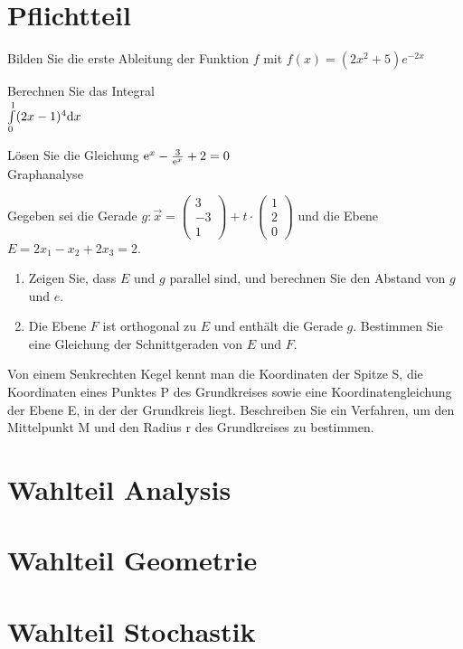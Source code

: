 



\section{Pflichtteil}
 Bilden Sie die erste Ableitung der Funktion $f$ mit $f(x) = (2x^2+5)e^{-2x}$

 Berechnen Sie das Integral\\
$\int\limits_0^1(2x-1)^4 \mathrm{d} x$

Lösen Sie die Gleichung $\mathrm{e}^x-\frac{3}{\mathrm{e}^x}+2=0$\\

\aufgabe{}
Graphanalyse
\loesung{}

Gegeben sei die Gerade $g: \vec x=\left(\begin{array}{c} 3 \\ -3 \\ 1 \end{array}\right) + t\cdot \left( \begin{array}{c} 1 \\ 2 \\ 0 \end{array} \right)$ und die Ebene $E = 2x_1-x_2+2x_3=2$.
\begin{enumerate}
  \item Zeigen Sie, dass $E$ und $g$ parallel sind, und berechnen Sie den Abstand von $g$ und $e$.
  \item Die Ebene $F$ ist orthogonal zu $E$ und enthält die Gerade $g$. Bestimmen Sie eine Gleichung der Schnittgeraden von $E$ und $F$.
\end{enumerate}

Von einem Senkrechten Kegel kennt man die Koordinaten der Spitze S, die Koordinaten eines Punktes P des Grundkreises sowie eine Koordinatengleichung der Ebene E, in der der Grundkreis liegt. Beschreiben Sie ein Verfahren, um den Mittelpunkt M und den Radius r des Grundkreises zu bestimmen.


\loesung{}


\section{Wahlteil Analysis}

\aufgabe{}

\aufgabe{}

\aufgabe{}

\section{Wahlteil Geometrie}

\aufgabe{}

\aufgabe{}

\aufgabe{}

\section{Wahlteil Stochastik}

\aufgabe{}

\aufgabe{}
\aufgabe{}
\aufgabe{}


